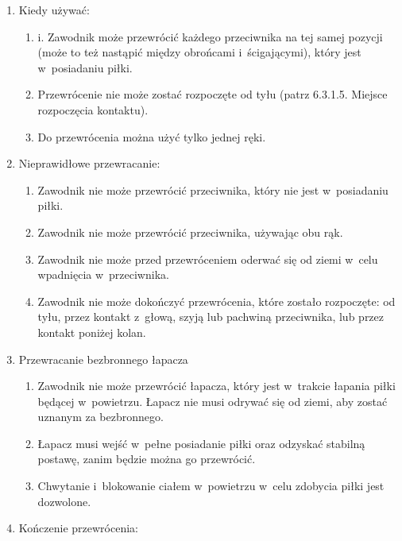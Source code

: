 \documentclass[12pt]{article}
\begin{document}
\begin{enumerate}
	\item
	      Kiedy używać:

	      \begin{enumerate}
		      \item
		            i. Zawodnik może przewrócić każdego przeciwnika na tej samej pozycji
		            (może to też nastąpić między obrońcami i~ścigającymi), który jest w~posiadaniu piłki.
		      \item
		            Przewrócenie nie może zostać rozpoczęte od tyłu (patrz 6.3.1.5.
		            Miejsce rozpoczęcia kontaktu).
		      \item
		            Do przewrócenia można użyć tylko jednej ręki.
	      \end{enumerate}
	\item
	      Nieprawidłowe przewracanie:

	      \begin{enumerate}
		      \item
		            Zawodnik nie może przewrócić przeciwnika, który nie jest w~posiadaniu piłki.
		      \item
		            Zawodnik nie może przewrócić przeciwnika, używając obu rąk.
		      \item
		            Zawodnik nie może przed przewróceniem oderwać się od ziemi w~celu
		            wpadnięcia w~przeciwnika.
		      \item
		            Zawodnik nie może dokończyć przewrócenia, które zostało rozpoczęte:
		            od tyłu, przez kontakt z~głową, szyją lub pachwiną przeciwnika, lub
		            przez kontakt poniżej kolan.
	      \end{enumerate}
	\item
	      Przewracanie bezbronnego łapacza

	      \begin{enumerate}
		      \item
		            Zawodnik nie może przewrócić łapacza, który jest w~trakcie łapania
		            piłki będącej w~powietrzu. Łapacz nie musi odrywać się od ziemi, aby
		            zostać uznanym za bezbronnego.
		      \item
		            Łapacz musi wejść w~pełne posiadanie piłki oraz odzyskać stabilną
		            postawę, zanim będzie można go przewrócić.
		      \item
		            Chwytanie i~blokowanie ciałem w~powietrzu w~celu zdobycia piłki jest
		            dozwolone.
	      \end{enumerate}
	\item
	      Kończenie przewrócenia:


\end{enumerate}
\end{document}
